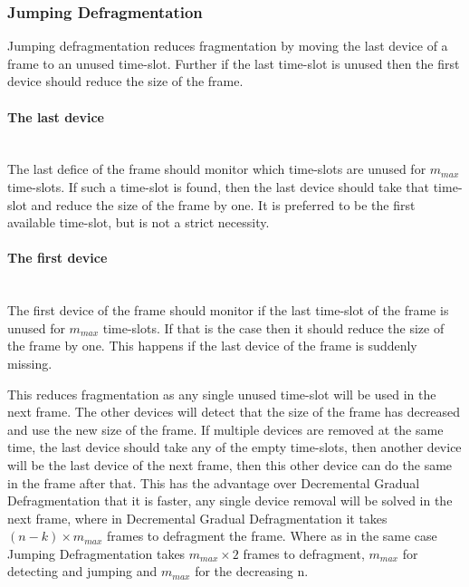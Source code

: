 \subsubsection{Jumping Defragmentation}
Jumping defragmentation reduces fragmentation by moving the last device of a frame to an unused time-slot. Further if the last time-slot is unused then the first device should reduce the size of the frame.

\paragraph{The last device}\hfill\\
The last defice of the frame should monitor which time-slots are unused for $m_{max}$ time-slots. 
If such a time-slot is found, then the last device should take that time-slot and reduce the size of the frame by one. 
It is preferred to be the first available time-slot, but is not a strict necessity.   

\paragraph{The first device}\hfill\\
The first device of the frame should monitor if the last time-slot of the frame is unused for $m_{max}$ time-slots.
If that is the case then it should reduce the size of the frame by one.
This happens if the last device of the frame is suddenly missing.


\bigskip \noindent
This reduces fragmentation as any single unused time-slot will be used in the next frame.
The other devices will detect that the size of the frame has decreased and use the new size of the frame. 
If multiple devices are removed at the same time, the last device should take any of the empty time-slots, then another device will be the last device of the next frame, then this other device can do the same in the frame after that. 
This has the advantage over Decremental Gradual Defragmentation that it is faster, any single device removal will be solved in the next frame, where in Decremental Gradual Defragmentation it takes $(n - k) \times m_{max}$ frames to defragment the frame. 
Where as in the same case Jumping Defragmentation takes $m_{max} \times 2$ frames to defragment, $m_{max}$ for detecting and jumping and $m_{max}$ for the decreasing n. 

